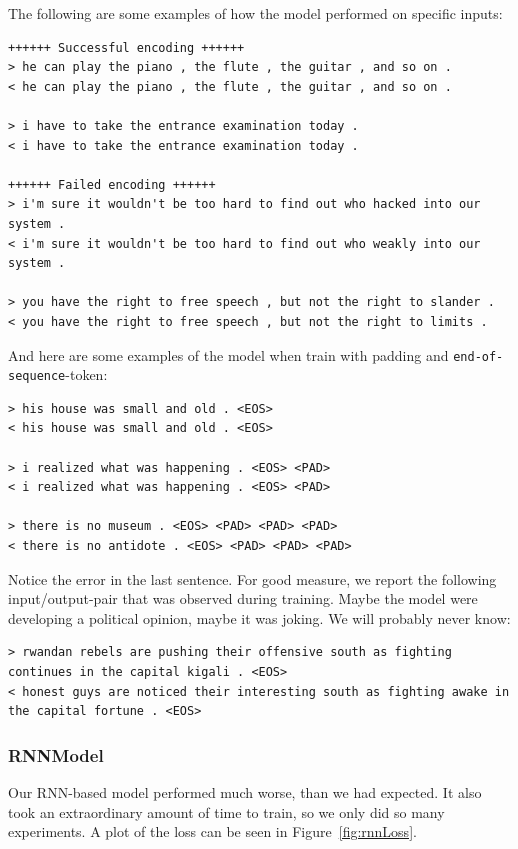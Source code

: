 \documentclass{article}
\begin{document}
The following are some examples of how the model performed on specific inputs:

\begin{verbatim}
++++++ Successful encoding ++++++
> he can play the piano , the flute , the guitar , and so on .
< he can play the piano , the flute , the guitar , and so on .

> i have to take the entrance examination today .
< i have to take the entrance examination today .

++++++ Failed encoding ++++++
> i'm sure it wouldn't be too hard to find out who hacked into our system .
< i'm sure it wouldn't be too hard to find out who weakly into our system .

> you have the right to free speech , but not the right to slander .
< you have the right to free speech , but not the right to limits .
\end{verbatim}

And here are some examples of the model when train with padding and
\texttt{end-of-sequence}-token:

\begin{verbatim}
> his house was small and old . <EOS>
< his house was small and old . <EOS>

> i realized what was happening . <EOS> <PAD>
< i realized what was happening . <EOS> <PAD>

> there is no museum . <EOS> <PAD> <PAD> <PAD>
< there is no antidote . <EOS> <PAD> <PAD> <PAD>
\end{verbatim}

Notice the error in the last sentence. For good measure, we report the following
input/output-pair that was observed during training. Maybe the model were
developing a political opinion, maybe it was joking. We will probably never
know:

\begin{verbatim}
> rwandan rebels are pushing their offensive south as fighting continues in the capital kigali . <EOS>
< honest guys are noticed their interesting south as fighting awake in the capital fortune . <EOS>
\end{verbatim}

\subsubsection{RNNModel}

Our RNN-based model performed much worse, than we had expected. It also took an
extraordinary amount of time to train, so we only did so many experiments. A
plot of the loss can be seen in Figure~\ref{fig:rnnLoss}. 
\end{document}
